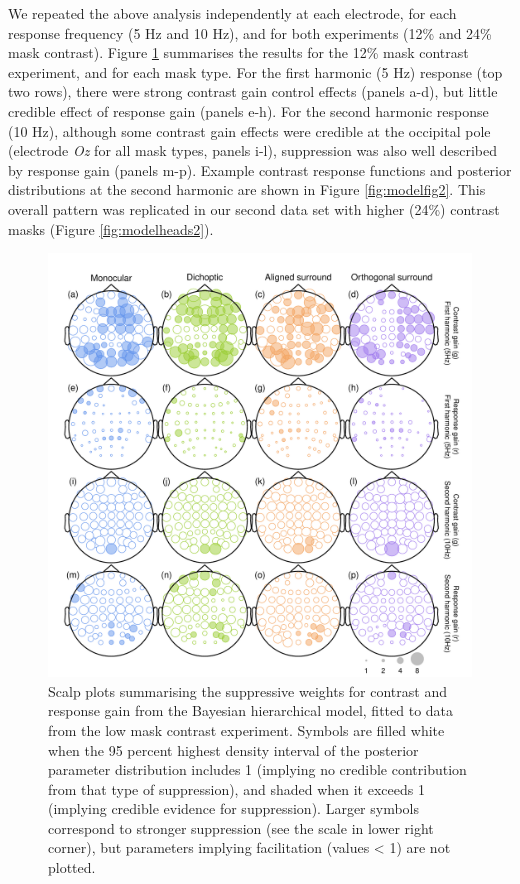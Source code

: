 \documentclass[]{article}
\begin{document}
We repeated the above analysis independently at each electrode, for each response frequency (5 Hz and 10 Hz), and for both experiments (12\% and 24\% mask contrast). Figure \ref{fig:modelheads1} summarises the results for the 12\% mask contrast experiment, and for each mask type. For the first harmonic (5 Hz) response (top two rows), there were strong contrast gain control effects (panels a-d), but little credible effect of response gain (panels e-h). For the second harmonic response (10 Hz), although some contrast gain effects were credible at the occipital pole (electrode \emph{Oz} for all mask types, panels i-l), suppression was also well described by response gain (panels m-p). Example contrast response functions and posterior distributions at the second harmonic are shown in Figure \ref{fig:modelfig2}. This overall pattern was replicated in our second data set with higher (24\%) contrast masks (Figure \ref{fig:modelheads2}).

\begin{figure}

{\centering \includegraphics{figures/modelheads1} 

}

\caption{Scalp plots summarising the suppressive weights for contrast and response gain from the Bayesian hierarchical model, fitted to data from the low mask contrast experiment. Symbols are filled white when the 95 percent highest density interval of the posterior parameter distribution includes 1 (implying no credible contribution from that type of suppression), and shaded when it exceeds 1 (implying credible evidence for suppression). Larger symbols correspond to stronger suppression (see the scale in lower right corner), but parameters implying facilitation (values < 1) are not plotted.}\label{fig:modelheads1}
\end{figure}
\end{document}
